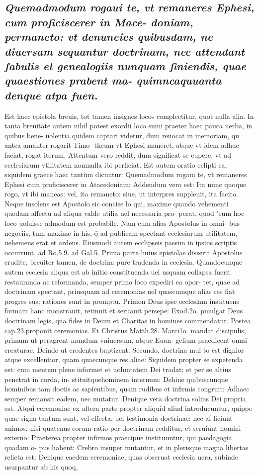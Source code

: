 \documentclass{article}
\begin{document}
\begin{pages}
\subsection*{\textit{Quemadmodum rogaui te, vt remaneres Ephesi, cum proficiscerer in Mace- doniam, permaneto: vt denuncies quibusdam, ne diuersam sequantur doctrinam, nec attendant fabulis et genealogiis nunquam finiendis, quae quaestiones prabent ma- quimncaquuanta denque atpa fuen. }}\pstart Est haec epistola breuis, tot tamen insignes locos complectitur, quot nulla alia. In tanta breuitate autem nihil potest exordii loco sumi praeter haec pauca uerba, in quibus bene- uolentia quidem captari videtur, dum reuocat in memoriam, qu antea amanter rogarit Timo- theum vt Ephesi maneret, atque  vt idem adhuc faciat, rogat iterum. Attentum vero reddit, dum significat se cupere, vt ad ecclesiarum vtilitatem nomnulla ibi perficiat. Est autem oratio eclipti ca, siquidem graece haec tantùm dicuntur: Quemadmodum rogaui te, vt remaneres Ephesi cum proficiscerer in Atacedoniam: Addendum vero est: Ita nunc quoque  rogo, vt ibi maneas: vel, ita remaneto: siue, ut interpres suppleuit, ita facito. Neque  insolens est Apostolo sic concise lo qui, maxime quando vehementi quodam affectu ad aliqua valde utilia uel necessaria pro- perat, quod 'eum hoc loco uoluisse admodum est probabile. Nam cum alias Apostolus in omni- bus negociis, tum maxime in his, q̃ ad publicam spectant ecclesiarum utilitatem, uehemens erat et ardens. Eiusmodi autem ecclipseis passim in ipsius scriptis occurrunt, ad Ro.5.9. ad Gal.5.  \pend\pstart Prima parte huius epistolae disserit Apostolus erudite, breuiter tamen, de doctrina pure tradenda in ecclesia. Quandocunque  autem ecclesia aliqua est ab initio constituenda uel usquam collapsa fuerit restauranda ac reformanda, semper primo loco expediri ea opor- tet, quae ad doctrinam spectant, priusquam ad ceremonias uel quascumque  alias res fiat progres sus: rationes sunt in promptu. Primon Deus ipse eccleslam instituens formam hanc monstrauit, retinuit et seruauit persepe: Exod.2o. pmulgat Deus doctrinam legis, qua fides in Deum et Charitas in homines commendatur. Postea cap.23.proponit ceremonias. Et Christus Matth.28. Marci1o. mandat discipulis, primum ut peragrent mundum vniuersum, atque  Euan- gelium praedicent omni creaturae. Deinde ut credentes baptizent. Secundo, doctrina mul to est dignior atque  excellentior, quam quaecunque  res aliae: Siquidem propter se expetenda est: cum mentem plene informet et uoluntatem Dei tradat: et per se altius penetrat in corda, in- stituitquehominem internum: Dehine quibuscunque  hominibus tam doctis ac sapientibus, quam rudibus et infirmis congruit: Adhaec semper remansit eadem, nec mutatur. Denique  vera doctrina solius Dei propria est. Atqui ceremoniae ex altera parte propter aliquid aliud introducuntur, quippe quae signa tantum sunt, vel effecta, uel testimonia doctrinae: nec af ficiunt animos, nisi quatenus eorum ratio per doctrinam redditur, et seruiunt homini externo: Praeterea propter infirmos praecipue instituuntur, qui paedagogia quadam o- pus habent: Crebro insuper mutantur, et in plerisque  magna libertas relicta est: Denique  eaedem ceremoniae, quas obseruat ecclesia uera, subinde usurpantur ab his quoq, 
\end{pages}
\end{document}
